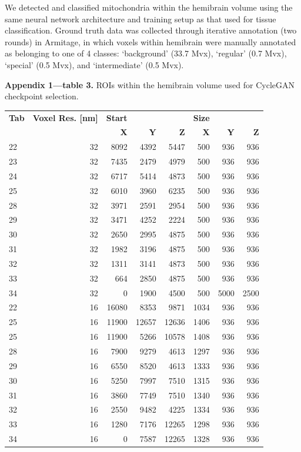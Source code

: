 \documentclass{article}
\begin{document}
We detected and classified mitochondria within the hemibrain volume using the same neural network architecture and training setup as that used for tissue classification. Ground truth data was collected through iterative annotation (two rounds) in Armitage, in which voxels within hemibrain were manually annotated as belonging to one of 4 classes: ‘background’ (33.7 Mvx), ‘regular’ (0.7 Mvx), ‘special’ (0.5 Mvx), and ‘intermediate’ (0.5 Mvx).

\noindent\textbf{Appendix 1—table 3.} ROIs within the hemibrain volume used for CycleGAN checkpoint selection.
\begin{center}\footnotesize
\begin{longtable}{lrrrrrrr}
\textbf{Tab} & \textbf{Voxel Res. [nm]} & \textbf{Start} & & & \textbf{Size} & & \\
 & & \textbf{X} & \textbf{Y} & \textbf{Z} & \textbf{X} & \textbf{Y} & \textbf{Z} \\
\hline
22 & 32 & 8092 & 4392 & 5447 & 500 & 936 & 936 \\
23 & 32 & 7435 & 2479 & 4979 & 500 & 936 & 936 \\
24 & 32 & 6717 & 5414 & 4873 & 500 & 936 & 936 \\
25 & 32 & 6010 & 3960 & 6235 & 500 & 936 & 936 \\
28 & 32 & 3971 & 2591 & 2954 & 500 & 936 & 936 \\
29 & 32 & 3471 & 4252 & 2224 & 500 & 936 & 936 \\
30 & 32 & 2650 & 2995 & 4875 & 500 & 936 & 936 \\
31 & 32 & 1982 & 3196 & 4875 & 500 & 936 & 936 \\
32 & 32 & 1311 & 3141 & 4873 & 500 & 936 & 936 \\
33 & 32 & 664 & 2850 & 4875 & 500 & 936 & 936 \\
34 & 32 & 0 & 1900 & 4500 & 500 & 5000 & 2500 \\
22 & 16 & 16080 & 8353 & 9871 & 1034 & 936 & 936 \\
25 & 16 & 11900 & 12657 & 12636 & 1406 & 936 & 936 \\
25 & 16 & 11900 & 5266 & 10578 & 1408 & 936 & 936 \\
28 & 16 & 7900 & 9279 & 4613 & 1297 & 936 & 936 \\
29 & 16 & 6550 & 8520 & 4613 & 1333 & 936 & 936 \\
30 & 16 & 5250 & 7997 & 7510 & 1315 & 936 & 936 \\
31 & 16 & 3860 & 7749 & 7510 & 1340 & 936 & 936 \\
32 & 16 & 2550 & 9482 & 4225 & 1334 & 936 & 936 \\
33 & 16 & 1280 & 7176 & 12265 & 1298 & 936 & 936 \\
34 & 16 & 0 & 7587 & 12265 & 1328 & 936 & 936 \\
\end{longtable}
\end{center}
\end{document}
